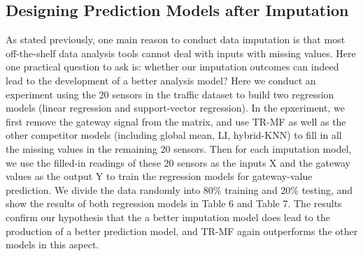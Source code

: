 

\subsection{Designing Prediction Models after Imputation}
As stated previously, one main reason to conduct data imputation is that most off-the-shelf data analysis tools cannot deal with inputs with missing values. Here one practical question to ask is: whether our imputation outcomes can indeed lead to the development of a better analysis model? Here we conduct an experiment using the 20 sensors in the traffic dataset to build two regression models (linear regression and support-vector regression). In the epxeriment, we first remove the gateway signal from the matrix, and use TR-MF as well as the other competitor models (including global mean, LI, hybrid-KNN) to fill in all the missing values in the remaining 20 sensors. Then for each imputation model, we use the filled-in readings of these 20 sensors as the inputs X and the gateway values as the output Y to train the regression models for gateway-value prediction. We divide the data randomly into 80\% training and 20\% testing, and show the results of both regression models in Table 6 and Table 7. The results confirm our hypothesis that the a better imputation model does lead to the production of a better prediction model, and TR-MF again outperforms the other models in this aspect.


